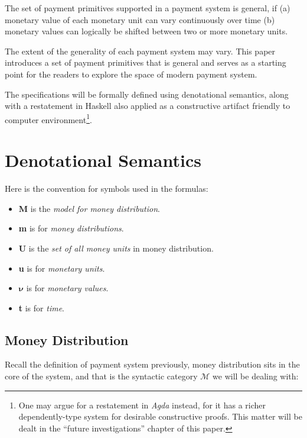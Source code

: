 The set of payment primitives supported in a payment system is general, if (a) monetary value of each monetary unit can
vary continuously over time (b) monetary values can logically be shifted between two or more monetary units.

The extent of the generality of each payment system may vary. This paper introduces a set of payment primitives that is
general and serves as a starting point for the readers to explore the space of modern payment system.

The specifications will be formally defined using denotational semantics, along with a restatement in Haskell also
applied as a constructive artifact friendly to computer environment\footnote{One may argue for a restatement in
\textit{Agda} instead, for it has a richer dependently-type system for desirable constructive proofs. This matter will
be dealt in the ``future investigations'' chapter of this paper.}.

\section{Denotational Semantics}

Here is the convention for symbols used in the formulas:

\begin{itemize}
\item \textbf{M} is the \textit{model for money distribution}.
\item \textbf{m} is for \textit{money distributions}.
\item \textbf{U} is the \textit{set of all money units} in money distribution.
\item \textbf{u} is for \textit{monetary units}.
\item $\boldsymbol{\nu}$ is for \textit{monetary values}.
\item \textbf{t} is for \textit{time}.
\end{itemize}

\subsection{Money Distribution}

Recall the definition of payment system previously, money distribution sits in the core of the system, and that is the
syntactic category $\mathcal{M}$ we will be dealing with:

